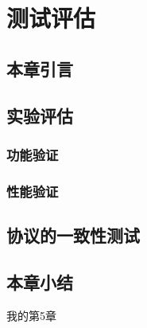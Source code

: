 \chapter{测试评估}
\label{cha:china}


\section{本章引言}

\section{实验评估}

\subsection{功能验证}
\subsection{性能验证}

\section{协议的一致性测试}


\section{本章小结}

我的第5章
